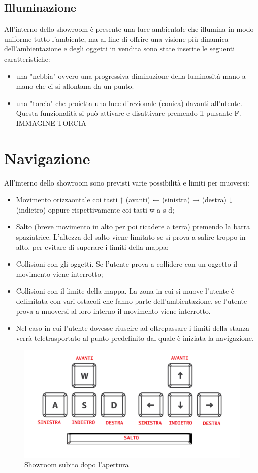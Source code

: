\subsection{Illuminazione}
All'interno dello showroom è presente una luce ambientale che illumina in modo uniforme tutto l'ambiente, ma al fine di offrire una visione più dinamica dell'ambientazione e degli oggetti in vendita sono state inserite le seguenti caratteristiche:
\begin{itemize}
	\item una "nebbia" ovvero una progressiva diminuzione della luminosità mano a mano che ci si allontana da un punto.
	\item una "torcia" che proietta una luce direzionale (conica) davanti all'utente. Questa funzionalità si può attivare e disattivare premendo il pulsante F.
IMMAGINE TORCIA
\end{itemize}


\section{Navigazione}
All'interno dello showroom sono previsti varie possibilità e limiti per muoversi:
\begin{itemize}
	\item Movimento orizzaontale coi tasti ↑ (avanti) ← (sinistra) → (destra) ↓ (indietro) oppure rispettivamente coi tasti w a s d;
	\item Salto (breve movimento in alto per poi ricadere a terra) premendo la barra spaziatrice. L'altezza del salto viene limitato se si prova a salire troppo in alto, per evitare di superare i limiti della mappa;
	\item Collisioni con gli oggetti. Se l’utente prova a collidere con un oggetto il movimento viene interrotto;
	\item Collisioni con il limite della mappa. La zona in cui si muove l'utente è delimitata con vari ostacoli che fanno parte dell'ambientazione, se l'utente prova a muoversi al loro interno il movimento viene interrotto. 
	\item Nel caso in cui l'utente dovesse riuscire ad oltrepassare i limiti della stanza verrà teletrasportato al punto predefinito dal quale è iniziata la navigazione.
\end{itemize}
\begin{figure}[H]
  \renewcommand{\thefigure}{2}
  \includegraphics[width=\linewidth]{./res/images/comandi_direzionali.png}
  \caption{Showroom subito dopo l'apertura}
  \label{Showroom subito dopo l'apertura}
\end{figure}

